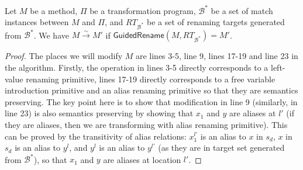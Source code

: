 \documentclass[a4paper, USenglish]{lipics-v2016}
\theoremstyle{plain}
\begin{document}
\begin{prop}
  Let $M$ be a method, $\Pi$ be a transformation program,
  $\mathcal{B}^*$ be a set of match instances between $M$ and $\Pi$, and
  $RT_{\mathcal{B}^*}$ be a set of renaming targets generated from $\mathcal{B}^*$. We have
  $M\xrightarrow{\sim} M'$ if $\mathsf{GuidedRename}(M,
\mathit{RT}_{\mathcal{B}^*})=M'$.
\end{prop}
\begin{proof} The places we will modify $M$ are lines 3-5, line 9, lines 17-19 and line 23 in the algorithm. Firstly, the operation in lines 3-5 directly corresponds to a left-value renaming primitive, lines 17-19 directly corresponds to a free variable introduction primitive and an alias renaming primitive so that they are semantics preserving. The key point here is to show that modification in line 9 (similarly, in line 23) is also semantics preserving by showing that $x_1$ and $y$ are aliases at $l'$ (if they are aliases, then we are transforming with alias renaming primitive). This can be proved by the transitivity of alias relations: $x_1^{l'}$ is an alias to $x$ in $s_d$, $x$ in $s_d$ is an alias to $y^l$, and $y^l$ is an alias to $y^{l'}$ (as they are in target set generated from $\mathcal{B}^*$), so that $x_1$ and $y$ are aliases at location $l'$.
\end{proof}
\end{document}

